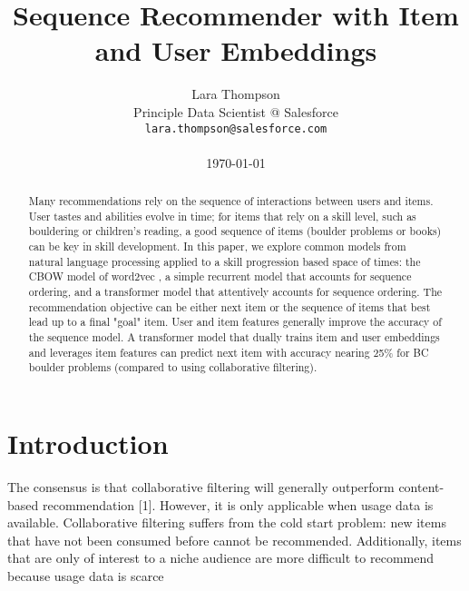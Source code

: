 \documentclass[10pt]{article}
\title{Sequence Recommender with Item and User Embeddings}
\author{Lara Thompson \\
  Principle Data Scientist @ Salesforce \\
  \texttt{lara.thompson@salesforce.com} \\ \\
  \today
}
\begin{document}
\maketitle
\begin{abstract}
Many recommendations rely on the sequence of interactions between users and items. User tastes and abilities evolve in time; for items that rely on a skill level, such as bouldering or children's reading, a good sequence of items (boulder problems or books) can be key in skill development. In this paper, we explore common models from natural language processing applied to a skill progression based space of times: the CBOW model of word2vec \cite{word2vec}, a simple recurrent model that accounts for sequence ordering, and a transformer model that attentively accounts for sequence ordering. The recommendation objective can be either next item or the sequence of items that best lead up to a final "goal" item. User and item features generally improve the accuracy of the sequence model. A transformer model that dually trains item and user embeddings and leverages item features can predict next item with accuracy nearing 25\% for BC boulder problems (compared to  using collaborative filtering).
\end{abstract}

\section{Introduction}





The consensus is that collaborative filtering will generally outperform content-based recommendation [1]. However, it is only applicable when usage data is available. Collaborative filtering suffers from the cold start problem: new items that have not been consumed before cannot be recommended. Additionally, items that are only of interest to a niche audience are more difficult to recommend because usage data is scarce
\end{document}
